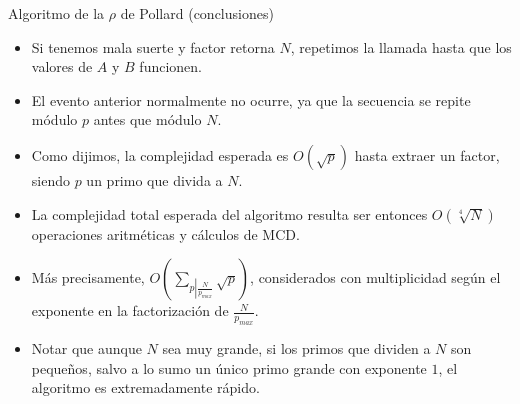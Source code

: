 \documentclass{beamer}
\begin{document}
\begin{frame}{Algoritmo de la $\rho$ de Pollard (conclusiones)}

    \begin{itemize}
      \item Si tenemos mala suerte y factor retorna $N$, repetimos la llamada hasta que los valores de $A$ y $B$ funcionen.
      \item El evento anterior normalmente no ocurre, ya que la secuencia se repite módulo $p$ antes que módulo $N$.
      \item Como dijimos, la complejidad esperada es $O(\sqrt{p})$ hasta extraer un factor, siendo $p$ un primo que divida a $N$.
      \item La complejidad total esperada del algoritmo resulta ser entonces $O \left (\sqrt[4]{N} \right )$ operaciones aritméticas y cálculos de MCD.
      \item Más precisamente, $O \left (\sum_{p \left |\frac{N}{p_{max}} \right .}{\sqrt p} \right )$, considerados con multiplicidad según el exponente en la factorización de $\frac{N}{p_{max}}$.
      \item Notar que aunque $N$ sea muy grande, si los primos que dividen a $N$ son pequeños, salvo a lo sumo un único primo grande con exponente $1$, el algoritmo es extremadamente rápido.
    \end{itemize}
\end{frame}
\end{document}
